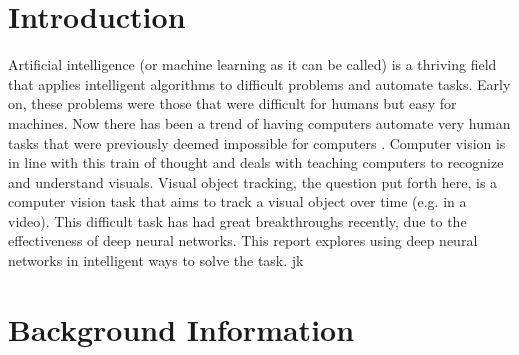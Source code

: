\documentclass[letterpaper,12pt,titlepage,oneside,final]{book}
\begin{document}
 

\chapter{Introduction}
Artificial intelligence (or machine learning as it can be called) is a thriving field that applies intelligent algorithms to difficult problems and automate tasks. Early on, these problems were those that were difficult for humans but easy for machines. Now there has been a trend of having computers automate very human tasks that were previously deemed impossible for computers \cite{deep-learning-book}. Computer vision is in line with this train of thought and deals with teaching computers to recognize and understand visuals. Visual object tracking, the question put forth here, is a computer vision task that aims to track a visual object over time (e.g. in a video). This difficult task has had great breakthroughs recently, due to the effectiveness of deep neural networks. This report explores using deep neural networks in intelligent ways to solve the task.
jk
\chapter{Background Information}
\end{document}
